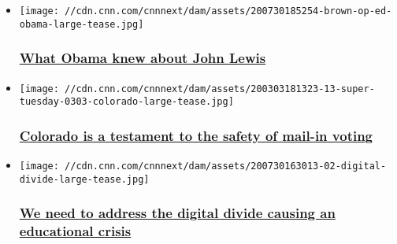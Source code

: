 \begin{itemize}
\item
  \href{/2020/07/30/opinions/what-obama-knew-about-john-lewis-brown/index.html}{}

  \texttt{[image: //cdn.cnn.com/cnnnext/dam/assets/200730185254-brown-op-ed-obama-large-tease.jpg]}

  \hypertarget{what-obama-knew-about-john-lewis}{%
  \subsubsection{\texorpdfstring{\href{/2020/07/30/opinions/what-obama-knew-about-john-lewis-brown/index.html}{What
  Obama knew about John
  Lewis}}{What Obama knew about John Lewis}}\label{what-obama-knew-about-john-lewis}}
\end{itemize}

\begin{itemize}
\item
  \href{/2020/07/30/opinions/colorado-debunking-myths-mail-in-voting-trump-stern/index.html}{}

  \texttt{[image: //cdn.cnn.com/cnnnext/dam/assets/200303181323-13-super-tuesday-0303-colorado-large-tease.jpg]}

  \hypertarget{colorado-is-a-testament-to-the-safety-of-mail-in-voting}{%
  \subsubsection{\texorpdfstring{\href{/2020/07/30/opinions/colorado-debunking-myths-mail-in-voting-trump-stern/index.html}{Colorado
  is a testament to the safety of mail-in
  voting}}{Colorado is a testament to the safety of mail-in voting}}\label{colorado-is-a-testament-to-the-safety-of-mail-in-voting}}
\end{itemize}

\begin{itemize}
\item
  \href{/2020/07/31/opinions/digital-divide-kids-education-wellness/index.html}{}

  \texttt{[image: //cdn.cnn.com/cnnnext/dam/assets/200730163013-02-digital-divide-large-tease.jpg]}

  \hypertarget{we-need-to-address-the-digital-divide-causing-an-educational-crisis}{%
  \subsubsection{\texorpdfstring{\href{/2020/07/31/opinions/digital-divide-kids-education-wellness/index.html}{We
  need to address the digital divide causing an educational
  crisis}}{We need to address the digital divide causing an educational crisis}}\label{we-need-to-address-the-digital-divide-causing-an-educational-crisis}}
\end{itemize}

